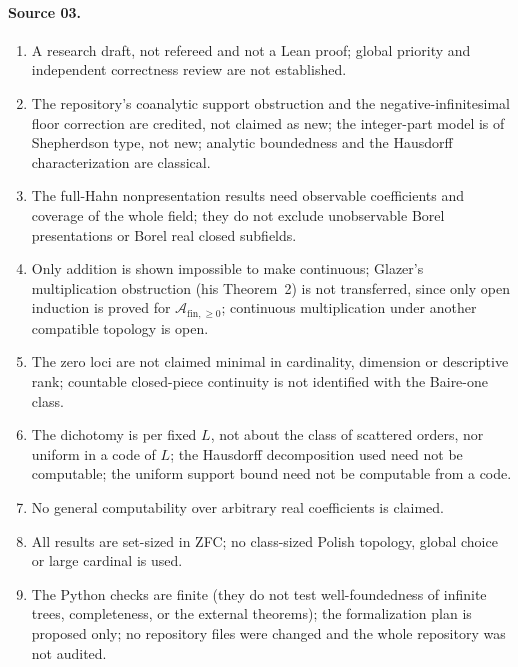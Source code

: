 \documentclass[11pt]{article}
\numberwithin{equation}{section}
\theoremstyle{definition}
\theoremstyle{remark}
\newcommand{\PP}{\mathcal A_{\mathrm{fin},\geq 0}}
\begin{document}
\paragraph{Source 03.}
\begin{enumerate}[label=03.\arabic*]
\item A research draft, not refereed and not a Lean proof; global priority
and independent correctness review are not established.
\item The repository's coanalytic support obstruction and the
negative-infinitesimal floor correction are credited, not claimed as new; the
integer-part model is of Shepherdson type, not new; analytic boundedness and
the Hausdorff characterization are classical.
\item The full-Hahn nonpresentation results need observable coefficients and
coverage of the whole field; they do not exclude unobservable Borel
presentations or Borel real closed subfields.
\item Only addition is shown impossible to make continuous; Glazer's
multiplication obstruction (his Theorem~2) is not transferred, since only open
induction is proved for $\PP$; continuous multiplication under another
compatible topology is open.
\item The zero loci are not claimed minimal in cardinality, dimension or
descriptive rank; countable closed-piece continuity is not identified with the
Baire-one class.
\item The dichotomy is per fixed $L$, not about the class of scattered orders,
nor uniform in a code of $L$; the Hausdorff decomposition used need not be
computable; the uniform support bound need not be computable from a code.
\item No general computability over arbitrary real coefficients is claimed.
\item All results are set-sized in ZFC; no class-sized Polish topology, global
choice or large cardinal is used.
\item The Python checks are finite (they do not test well-foundedness of
infinite trees, completeness, or the external theorems); the formalization
plan is proposed only; no repository files were changed and the whole
repository was not audited.
\end{enumerate}
\end{document}
